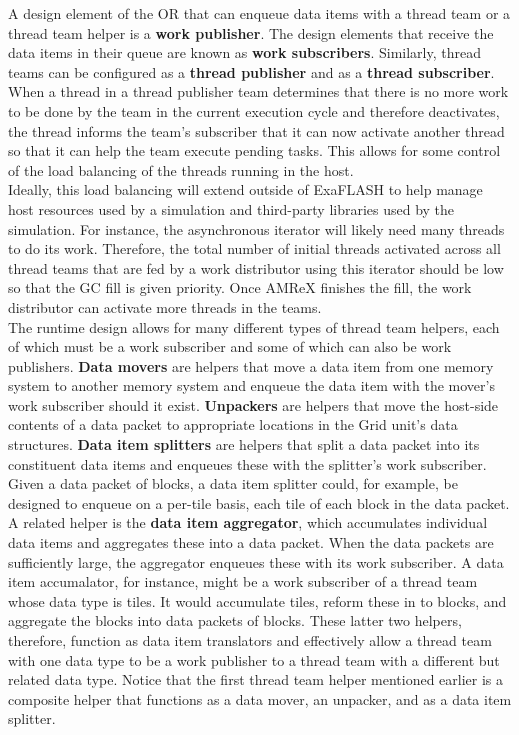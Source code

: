 \documentclass{article}
\newcommand{\FlashOfTheFuture}{ExaFLASH\xspace}
\newcommand{\shortOR}   {OR\xspace}
\newcommand{\OR}        {\shortOR}
\begin{document}
A design element of the \OR that can enqueue data items with a thread
team or a thread team helper is a \textbf{work publisher}.  The design elements
that receive the data items in their queue are known as \textbf{work
subscribers}.  Similarly, thread teams can be configured as a \textbf{thread
publisher} and as a \textbf{thread subscriber}.  When a thread in a thread
publisher team determines that there is no more work to be done by the team in the current
execution cycle and therefore deactivates, the thread informs the team's
subscriber that it can now activate another thread so that it can help the team
execute pending tasks.  This allows for some control of the load balancing of the
threads running in the host.\\

Ideally, this load balancing will extend outside of \FlashOfTheFuture to help manage host
resources used by a simulation and third-party libraries used by the simulation.
For instance, the asynchronous iterator will likely need many threads to do its
work.  Therefore, the total number of initial threads activated across all
thread teams that are fed by a work distributor using this iterator should be
low so that the GC fill is given priority.  Once AMReX finishes the fill, the
work distributor can activate more threads in the teams.\\

The runtime design allows for many different types of thread team helpers, each
of which must be a work subscriber and some of which can also be work
publishers. \textbf{Data movers} are helpers that move a data item from one memory system to
another memory system and enqueue the data item with the mover's work subscriber
should it exist.  \textbf{Unpackers} are helpers that move the host-side
contents of a data packet to appropriate locations in the Grid unit's data
structures.  \textbf{Data item splitters} are helpers that split a data packet
into its constituent data items and enqueues these with the splitter's work
subscriber.  Given a data packet of blocks, a data item splitter could, for
example, be designed to enqueue on a per-tile basis, each tile of each block in
the data packet.  A related helper is the \textbf{data item aggregator}, which
accumulates individual data items and aggregates these into a data packet.  When
the data packets are sufficiently large, the aggregator enqueues these with its
work subscriber.  A data item accumalator, for instance, might be a work
subscriber of a thread team whose data type is tiles.  It would accumulate
tiles, reform these in to blocks, and aggregate the blocks into data packets of
blocks.  These latter two helpers, therefore, function as data item
translators and effectively allow a thread team with one data type to be a work
publisher to a thread team with a different but related data type.  Notice that
the first thread team helper mentioned earlier is a composite helper that
functions as a data mover, an unpacker, and as a data item splitter.\\
\end{document}
